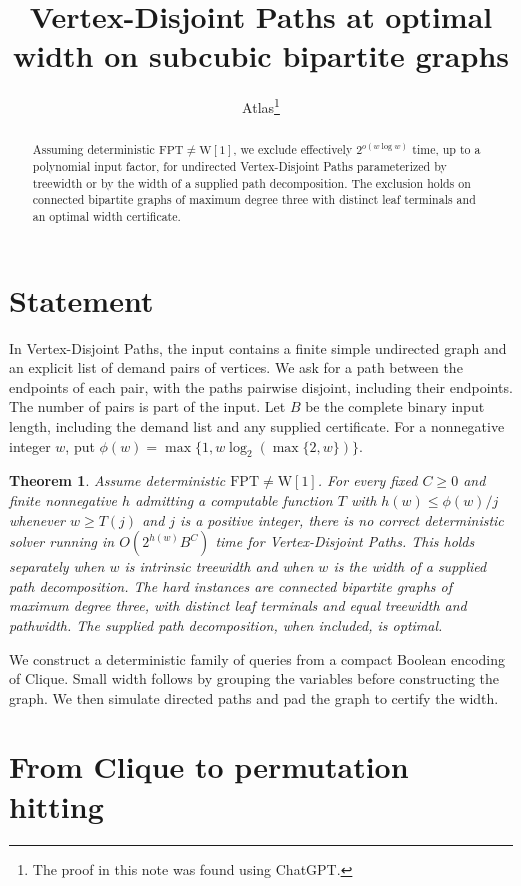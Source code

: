 \documentclass[11pt]{article}
\title{Vertex-Disjoint Paths at optimal width on subcubic bipartite graphs}
\author{Atlas\thanks{The proof in this note was found using ChatGPT.}}
\date{}
\newtheorem{theorem}{Theorem}
\begin{document}
\maketitle
\begin{abstract}
Assuming deterministic \(\mathrm{FPT}\ne\mathrm{W[1]}\), we exclude effectively
\(2^{o(w\log w)}\) time, up to a polynomial input factor, for undirected
Vertex-Disjoint Paths parameterized by treewidth or by the width of a supplied
path decomposition. The exclusion holds on connected bipartite graphs of
maximum degree three with distinct leaf terminals and an optimal width
certificate.
\end{abstract}

\section{Statement}

In Vertex-Disjoint Paths, the input contains a finite simple undirected graph
and an explicit list of demand pairs of vertices. We ask for a path between
the endpoints of each pair, with the paths pairwise disjoint, including their
endpoints. The number of pairs is part of the input. Let \(B\) be the complete
binary input length, including the demand list and any supplied certificate.
For a nonnegative integer \(w\), put
\(\phi(w)=\max\{1,w\log_2(\max\{2,w\})\}\).

\begin{theorem}\label{vdp-width-w1}\hypertarget{vdp-width-w1}{}
Assume deterministic \(\mathrm{FPT}\ne\mathrm{W[1]}\).
For every fixed \(C\ge 0\) and finite nonnegative \(h\) admitting a computable
function \(T\) with \(h(w)\le \phi(w)/j\) whenever \(w\ge T(j)\) and \(j\)
is a positive integer, there is no correct deterministic solver running in
\(O(2^{h(w)}B^C)\) time for Vertex-Disjoint Paths. This holds separately
when \(w\) is intrinsic treewidth and when \(w\) is the width of a supplied path
decomposition. The hard instances are connected bipartite graphs of maximum
degree three, with distinct leaf terminals and equal treewidth and pathwidth.
The supplied path decomposition, when included, is optimal.
\end{theorem}

We construct a deterministic family of queries from a compact Boolean encoding
of Clique. Small width follows by grouping the variables before constructing
the graph. We then simulate directed paths and pad the graph to certify the
width.

\section{From Clique to permutation hitting}
\end{document}
